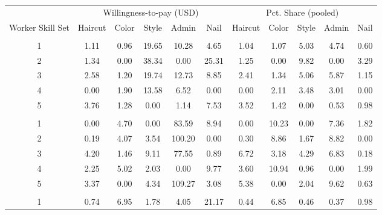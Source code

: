 \begin{threeparttable}

\centering
\begin{tabular}[t]{ccccccccccc}
\toprule
\multicolumn{1}{c}{ } & \multicolumn{5}{c}{Willingness-to-pay (USD)} & \multicolumn{5}{c}{Pct. Share (pooled)} \\
\cmidrule(l{3pt}r{3pt}){2-6} \cmidrule(l{3pt}r{3pt}){7-11}
Worker Skill Set & Haircut & Color & Style & Admin & Nail & Haircut & Color & Style & Admin & Nail\\
\midrule
\addlinespace[0.3em]
\multicolumn{11}{l}{\textbf{Cook}}\\
\hspace{1em}1 & 1.11 & 0.96 & 19.65 & 10.28 & 4.65 & 1.04 & 1.07 & 5.03 & 4.74 & 0.60\\
\hspace{1em}2 & 1.34 & 0.00 & 38.34 & 0.00 & 25.31 & 1.25 & 0.00 & 9.82 & 0.00 & 3.29\\
\hspace{1em}3 & 2.58 & 1.20 & 19.74 & 12.73 & 8.85 & 2.41 & 1.34 & 5.06 & 5.87 & 1.15\\
\hspace{1em}4 & 0.00 & 1.90 & 13.58 & 6.52 & 0.00 & 0.00 & 2.11 & 3.48 & 3.01 & 0.00\\
\hspace{1em}5 & 3.76 & 1.28 & 0.00 & 1.14 & 7.53 & 3.52 & 1.42 & 0.00 & 0.53 & 0.98\\
\addlinespace[0.3em]
\multicolumn{11}{l}{\textbf{New York}}\\
\hspace{1em}1 & 0.00 & 4.70 & 0.00 & 83.59 & 8.94 & 0.00 & 10.23 & 0.00 & 7.36 & 1.82\\
\hspace{1em}2 & 0.19 & 4.07 & 3.54 & 100.20 & 0.00 & 0.30 & 8.86 & 1.67 & 8.82 & 0.00\\
\hspace{1em}3 & 4.20 & 1.46 & 9.11 & 77.55 & 0.89 & 6.72 & 3.18 & 4.29 & 6.83 & 0.18\\
\hspace{1em}4 & 2.25 & 5.02 & 2.03 & 0.00 & 9.77 & 3.60 & 10.94 & 0.96 & 0.00 & 1.99\\
\hspace{1em}5 & 3.37 & 0.00 & 4.34 & 109.27 & 3.08 & 5.38 & 0.00 & 2.04 & 9.62 & 0.63\\
\addlinespace[0.3em]
\multicolumn{11}{l}{\textbf{Los Angeles}}\\
\hspace{1em}1 & 0.74 & 6.95 & 1.78 & 4.05 & 21.17 & 0.44 & 6.85 & 0.46 & 0.37 & 0.98\\

\end{tabular}
\end{threeparttable}
